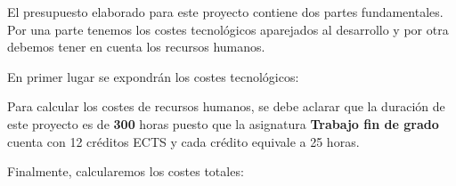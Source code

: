 


El presupuesto elaborado para este proyecto contiene dos partes fundamentales. Por una parte tenemos los costes tecnológicos aparejados al desarrollo y por otra debemos tener en cuenta los recursos humanos.

En primer lugar se expondrán los costes tecnológicos:



Para calcular los costes de recursos humanos, se debe aclarar que la duración de este proyecto es de \textbf{300} horas puesto que la asignatura \textbf{Trabajo fin de grado} cuenta con 12 créditos ECTS y cada crédito equivale a 25 horas.



Finalmente, calcularemos los costes totales:



